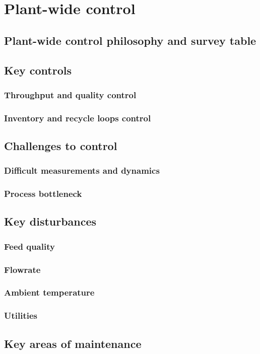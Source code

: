 \section{Plant-wide control}

\subsection{Plant-wide control philosophy and survey table}%


\subsection{Key controls}

\subsubsection{Throughput and quality control}


\subsubsection{Inventory and recycle loops control}




\subsection{Challenges to control}

\subsubsection{Difficult measurements and dynamics} %

\subsubsection{Process bottleneck} %



\subsection{Key disturbances} %

\subsubsection{Feed quality}

\subsubsection{Flowrate}

\subsubsection{Ambient temperature}

\subsubsection{Utilities}


\subsection{Key areas of maintenance} %